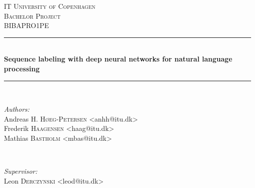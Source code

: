 \begin{titlepage}

\newcommand{\HRule}{\rule{\linewidth}{0.5mm}} %

\center %


\textsc{\LARGE IT University of Copenhagen}\\[1.5cm] %
\textsc{\Large Bachelor Project}\\[0.5cm] %
\textsc{\large BIBAPRO1PE}\\[0.5cm] %


\HRule \\[0.4cm]
{ \huge \bfseries Sequence labeling with deep neural networks for natural language processing}\\[0.4cm] %
\HRule \\[1.5cm]


\begin{minipage}{0.4\textwidth}
\begin{flushleft} \large
\emph{Authors:}\\
Andreas H. \textsc{Høeg-Petersen} <anhh@itu.dk> \\
Frederik \textsc{Haagensen} <haag@itu.dk> \\
Mathias \textsc{Bastholm} <mbas@itu.dk>
\end{flushleft}
\end{minipage}
~
\begin{minipage}{0.4\textwidth}
\begin{flushright} \large
\emph{Supervisor:} \\
Leon \textsc{Derczynski} <leod@itu.dk>
\end{flushright}
\end{minipage}\\[4cm]



\end{titlepage}
